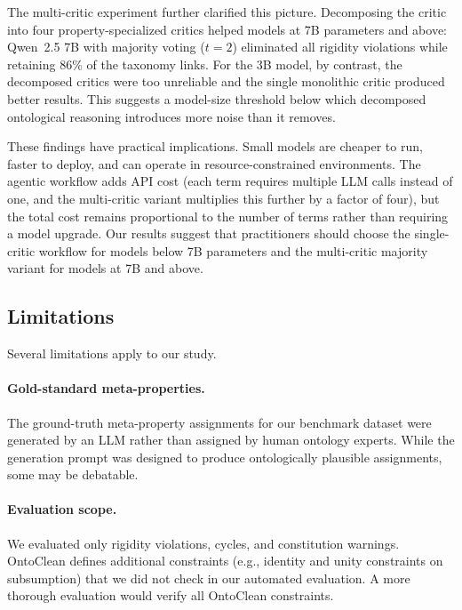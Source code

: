 \documentclass{IOS-Book-Article}
\begin{document}
The multi-critic experiment further clarified this picture.
Decomposing the critic into four property-specialized critics helped
models at 7B parameters and above: Qwen~2.5 7B with majority voting
($t{=}2$) eliminated all rigidity violations while retaining 86\% of
the taxonomy links.  For the 3B model, by contrast, the decomposed
critics were too unreliable and the single monolithic critic produced
better results.  This suggests a model-size threshold below which
decomposed ontological reasoning introduces more noise than it removes.

These findings have practical implications.  Small models are cheaper
to run, faster to deploy, and can operate in resource-constrained
environments.  The agentic workflow adds API cost (each term requires
multiple LLM calls instead of one, and the multi-critic variant
multiplies this further by a factor of four), but the total cost
remains proportional to the number of terms rather than requiring a
model upgrade.  Our results suggest that practitioners should choose
the single-critic workflow for models below 7B parameters and the
multi-critic majority variant for models at 7B and
above.

\subsection{Limitations}

Several limitations apply to our study.

\paragraph{Gold-standard meta-properties.}
The ground-truth meta-property assignments for our benchmark dataset
were generated by an LLM rather than assigned by human ontology
experts.  While the generation prompt was designed to produce
ontologically plausible assignments, some may be
debatable.

\paragraph{Evaluation scope.}
We evaluated only rigidity violations, cycles, and constitution
warnings.  OntoClean defines additional constraints (e.g., identity
and unity constraints on subsumption) that we did not check in our
automated evaluation.  A more thorough evaluation would verify all
OntoClean constraints.
\end{document}
